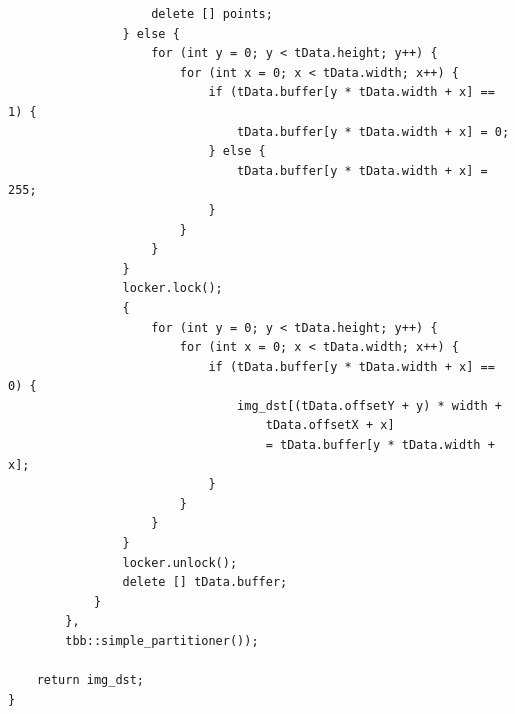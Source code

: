 \documentclass{report}
\begin{document}
\begin{lstlisting}
                    delete [] points;
                } else {
                    for (int y = 0; y < tData.height; y++) {
                        for (int x = 0; x < tData.width; x++) {
                            if (tData.buffer[y * tData.width + x] == 1) {
                                tData.buffer[y * tData.width + x] = 0;
                            } else {
                                tData.buffer[y * tData.width + x] = 255;
                            }
                        }
                    }
                }
                locker.lock();
                {
                    for (int y = 0; y < tData.height; y++) {
                        for (int x = 0; x < tData.width; x++) {
                            if (tData.buffer[y * tData.width + x] == 0) {
                                img_dst[(tData.offsetY + y) * width +
                                    tData.offsetX + x]
                                    = tData.buffer[y * tData.width + x];
                            }
                        }
                    }
                }
                locker.unlock();
                delete [] tData.buffer;
            }
        },
        tbb::simple_partitioner());

    return img_dst;
}

\end{lstlisting}
\end{document}
